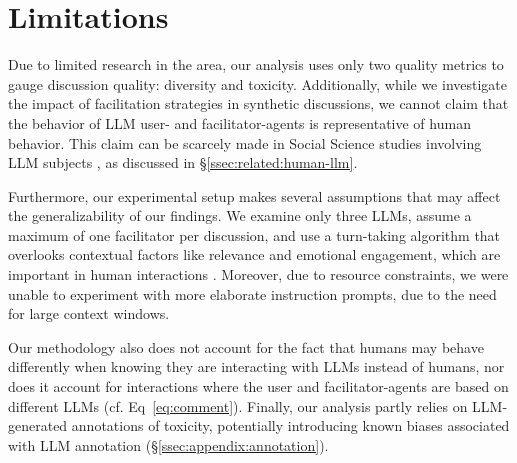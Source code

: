 %
\section{Limitations} 
\label{sec:limitations}

Due to limited research in the area, our analysis uses only two quality metrics to gauge discussion quality: diversity and toxicity. Additionally, while we investigate the impact of facilitation strategies in synthetic discussions, we cannot claim that the behavior of \ac{LLM} user- and facilitator-agents is representative of human behavior. This claim can be scarcely made in Social Science studies involving \ac{LLM} subjects \cite{rossi_2024, zhou-etal-2024-real}, as discussed in \S\ref{ssec:related:human-llm}.

Furthermore, our experimental setup makes several assumptions that may affect the generalizability of our findings. We examine only three \acp{LLM}, assume a maximum of one facilitator per discussion, and use a turn-taking algorithm that overlooks contextual factors like relevance and emotional engagement, which are important in human interactions \cite{robert_2016_comment, Ziegele03102018}. Moreover, due to resource constraints, we were unable to experiment with more elaborate instruction prompts, due to the need for large context windows. 

Our methodology also does not account for the fact that humans may behave differently when knowing they are interacting with \acp{LLM} instead of humans, nor  does it account for interactions where the user and facilitator-agents are based on different \acp{LLM} (cf. Eq~\ref{eq:comment}). Finally, our analysis partly relies on \ac{LLM}-generated annotations of toxicity, potentially introducing known biases associated with \ac{LLM} annotation (\S\ref{ssec:appendix:annotation}).